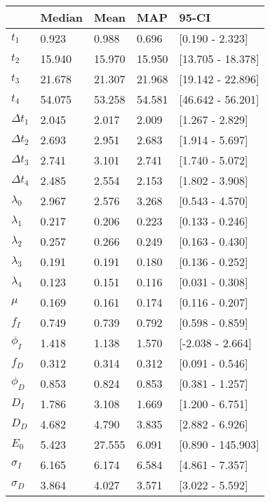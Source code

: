 \begin{tabular}{lllll}
\toprule
{} &  Median &    Mean &     MAP &              95-CI \\
\midrule
$t_1$        &   0.923 &   0.988 &   0.696 &    [0.190 - 2.323] \\
$t_2$        &  15.940 &  15.970 &  15.950 &  [13.705 - 18.378] \\
$t_3$        &  21.678 &  21.307 &  21.968 &  [19.142 - 22.896] \\
$t_4$        &  54.075 &  53.258 &  54.581 &  [46.642 - 56.201] \\
$\Delta t_1$ &   2.045 &   2.017 &   2.009 &    [1.267 - 2.829] \\
$\Delta t_2$ &   2.693 &   2.951 &   2.683 &    [1.914 - 5.697] \\
$\Delta t_3$ &   2.741 &   3.101 &   2.741 &    [1.740 - 5.072] \\
$\Delta t_4$ &   2.485 &   2.554 &   2.153 &    [1.802 - 3.908] \\
$\lambda_0$  &   2.967 &   2.576 &   3.268 &    [0.543 - 4.570] \\
$\lambda_1$  &   0.217 &   0.206 &   0.223 &    [0.133 - 0.246] \\
$\lambda_2$  &   0.257 &   0.266 &   0.249 &    [0.163 - 0.430] \\
$\lambda_3$  &   0.191 &   0.191 &   0.180 &    [0.136 - 0.252] \\
$\lambda_4$  &   0.123 &   0.151 &   0.116 &    [0.031 - 0.308] \\
$\mu$        &   0.169 &   0.161 &   0.174 &    [0.116 - 0.207] \\
$f_I$        &   0.749 &   0.739 &   0.792 &    [0.598 - 0.859] \\
$\phi_I$     &   1.418 &   1.138 &   1.570 &   [-2.038 - 2.664] \\
$f_D$        &   0.312 &   0.314 &   0.312 &    [0.091 - 0.546] \\
$\phi_D$     &   0.853 &   0.824 &   0.853 &    [0.381 - 1.257] \\
$D_I$        &   1.786 &   3.108 &   1.669 &    [1.200 - 6.751] \\
$D_D$        &   4.682 &   4.790 &   3.835 &    [2.882 - 6.926] \\
$E_0$        &   5.423 &  27.555 &   6.091 &  [0.890 - 145.903] \\
$\sigma_I$   &   6.165 &   6.174 &   6.584 &    [4.861 - 7.357] \\
$\sigma_D$   &   3.864 &   4.027 &   3.571 &    [3.022 - 5.592] \\

\end{tabular}

